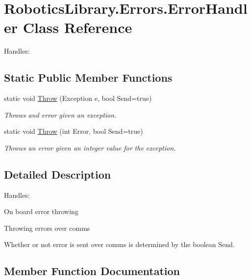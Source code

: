 \hypertarget{class_robotics_library_1_1_errors_1_1_error_handler}{}\section{Robotics\+Library.\+Errors.\+Error\+Handler Class Reference}
\label{class_robotics_library_1_1_errors_1_1_error_handler}


Handles\+:  


\subsection*{Static Public Member Functions}
\begin{DoxyCompactItemize}
\item 
static void \hyperlink{class_robotics_library_1_1_errors_1_1_error_handler_a3a4b2937527bf41cc34d4d244c20364c}{Throw} (Exception e, bool Send=true)
\begin{DoxyCompactList}\small\item\em Throws and error given an exception. \end{DoxyCompactList}\item 
static void \hyperlink{class_robotics_library_1_1_errors_1_1_error_handler_a3d2861114cd4e8cc38cd8c5a8c539a0e}{Throw} (int Error, bool Send=true)
\begin{DoxyCompactList}\small\item\em Throws an error given an integer value for the exception. \end{DoxyCompactList}\end{DoxyCompactItemize}


\subsection{Detailed Description}
Handles\+: 


\begin{DoxyItemize}
\item On board error throwing
\item Throwing errors over comms
\begin{DoxyItemize}
\item Whether or not error is sent over comms is determined by the boolean {\ttfamily Send}. 
\end{DoxyItemize}
\end{DoxyItemize}

\subsection{Member Function Documentation}
\mbox{\label{class_robotics_library_1_1_errors_1_1_error_handler_a3a4b2937527bf41cc34d4d244c20364c}} 
